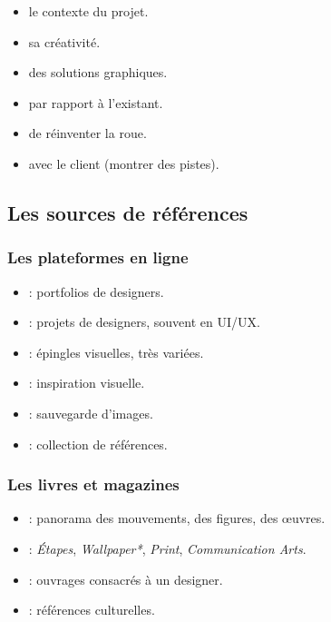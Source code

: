 \begin{itemize}
    \item {} le contexte du projet.
    \item {} sa créativité.
    \item {} des solutions graphiques.
    \item {} par rapport à l'existant.
    \item {} de réinventer la roue.
    \item {} avec le client (montrer des pistes).
\end{itemize}

\subsection{Les sources de références}

\subsubsection{Les plateformes en ligne}

\begin{itemize}
    \item {} : portfolios de designers.
    \item {} : projets de designers, souvent en UI/UX.
    \item {} : épingles visuelles, très variées.
    \item {} : inspiration visuelle.
    \item {} : sauvegarde d'images.
    \item {} : collection de références.
\end{itemize}

\subsubsection{Les livres et magazines}

\begin{itemize}
    \item {} : panorama des mouvements, des figures, des œuvres.
    \item {} : \emph{Étapes}, \emph{Wallpaper*}, \emph{Print}, \emph{Communication Arts}.
    \item {} : ouvrages consacrés à un designer.
    \item {} : références culturelles.
\end{itemize}

